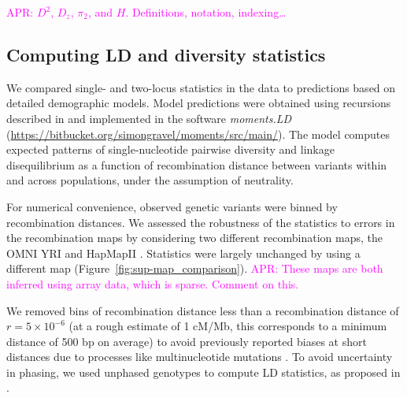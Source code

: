 \documentclass[]{article}
\newcommand{\aprcomment}[1]{{\textcolor{magenta}{APR: #1}}}
\begin{document}
\aprcomment{$D^2$, $D_z$, $\pi_2$, and $H$. Definitions, notation,
indexing\ldots}

\subsection{Computing LD and diversity statistics}\label{sec:computing-stats}

We compared single- and two-locus statistics in the data to predictions based
on detailed demographic models. Model predictions were obtained using
recursions described in \citet{Ragsdale2019-nt} and implemented in the software
\emph{moments.LD} (\url{https://bitbucket.org/simongravel/moments/src/main/}).
The model computes expected patterns of single-nucleotide pairwise diversity
and linkage disequilibrium as a function of recombination distance between
variants within and across populations, under the assumption of neutrality.

For numerical convenience, observed genetic variants were binned by
recombination distances. We assessed the robustness of the statistics to errors
in the recombination maps by considering two different recombination maps, the
OMNI YRI and HapMapII
\citep{1000_Genomes_Project_Consortium2015-zq,International_HapMap_Consortium2007-vn}.
Statistics were largely unchanged by using a different map
(Figure~\ref{fig:sup-map_comparison}). \aprcomment{These maps are both inferred
using array data, which is sparse. Comment on this.}

We removed bins of recombination distance less than a recombination distance of
$r = 5\times10^{-6}$ (at a rough estimate of 1 cM/Mb, this corresponds to a minimum
distance of 500 bp on average) to avoid previously reported biases at short
distances due to processes like multinucleotide mutations
\citep{Harris2014-zg,Ragsdale2019-nt}. To avoid uncertainty in phasing, we used
unphased genotypes to compute LD statistics, as proposed in
\citet{Ragsdale2020-nz}. 
\end{document}
